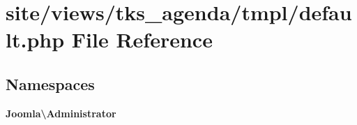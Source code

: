 \section{site/views/tks\+\_\+agenda/tmpl/default.php File Reference}
\label{site_2views_2tks__agenda_2tmpl_2default_8php}
\subsection*{Namespaces}
\begin{DoxyCompactItemize}
\item 
 \textbf{ Joomla\textbackslash{}\+Administrator}
\end{DoxyCompactItemize}
